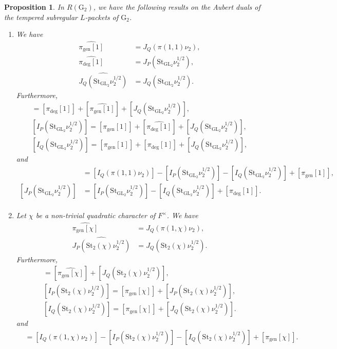 \documentclass[12pt]{amsart}
\theoremstyle{definition}
\theoremstyle{plain}
\newtheorem{proposition}[definition]{Proposition}
\theoremstyle{remark}
\def\GL{\mathrm{GL}}
\numberwithin{equation}{section}
\newcommand{\gen}{\mathrm{gen}}
\newcommand{\rG}{\mathrm{G}}
\newcommand{\St}{\mathrm{St}}
\begin{document}
\begin{proposition}\label{prop:subregular-abelian-Aubert-dual-computation}
      In $R(\rG_2)$, we have the following results on the Aubert duals of the tempered subregular $L$-packets of ${\rG_2}$.

      \begin{enumerate}
      \item 
      We have 
      \begin{align*}
            \widehat{\pi_{\gen}[1]} &= J_Q(\pi(1, 1) \nu_2), \\
            \widehat{\pi_{\deg}[1]} &= J_P(\St_{\GL_2}\nu_2^{1/2}), \\
            \widehat{J_Q(\St_{\GL_2}\nu_2^{1/2})} &= J_Q(\St_{\GL_2}\nu_2^{1/2}).
      \end{align*}
      Furthermore, 
      \begin{align*}
            [I_P(\mathbf{1}_{\GL_2}\nu_2^{1/2})] = [\pi_{\deg}[1]] + [\widehat{\pi_{\gen}[1]}] + [J_Q(\St_{\GL_2}\nu_2^{1/2})], \\
            [I_P(\St_{\GL_2}\nu_2^{1/2})] 
            =
             [\pi_{\gen}[1]] + [\widehat{\pi_{\deg}[1]}] + [J_Q(\St_{\GL_2}\nu_2^{1/2})], \\
            [I_Q(\St_{\GL_2}\nu_2^{1/2})] = [\pi_{\gen}[1]] + [\pi_{\deg}[1]] + [J_Q(\St_{\GL_2}\nu_2^{1/2})],
      \end{align*}
      and
      \begin{align*}
            [J_Q(\pi(1, 1) \nu_2)] &= [I_Q(\pi(1, 1)\nu_2)] - [I_P(\St_{\GL_2}\nu_2^{1/2})] - [I_Q(\St_{\GL_2}\nu_2^{1/2})] + [\pi_{\mathrm{gen}}[1]], \\
            [J_P(\St_{\GL_2}\nu_2^{1/2})] &= [I_P(\St_{\GL_2}\nu_2^{1/2})] - [I_Q(\St_{\GL_2}\nu_2^{1/2})] + [\pi_{\deg}[1]]. \\
      \end{align*}

      \item
      Let $\chi$ be a non-trivial quadratic character of $F^{\times}$.
      We have
      \begin{align*}
            \widehat{\pi_{\gen}[\chi]} &= J_Q(\pi(1, \chi) \nu_2), \\
            \widehat{J_P(\St_2(\chi)\nu_2^{1/2})} &= J_Q(\St_2(\chi)\nu_2^{1/2}).
      \end{align*}
      Furthermore, 
      \begin{align*}
            [I_P(\chi \circ \det \nu_2^{1/2})] = [\widehat{\pi_{\gen}[\chi]}] + [J_Q(\St_2(\chi)\nu_2^{1/2})], \\
            [I_P(\St_2(\chi)\nu_2^{1/2})] = [\pi_{\gen}[\chi]] + [J_P(\St_2(\chi)\nu_2^{1/2})], \\
            [I_Q(\St_2(\chi)\nu_2^{1/2})] = [\pi_{\gen}[\chi]] + [J_Q(\St_2(\chi)\nu_2^{1/2})].
      \end{align*}
      and
      \begin{align*}
            [J_Q(\pi(1, \chi) \nu_2)] &= [I_Q(\pi(1, \chi)\nu_2)] - [I_P(\St_2(\chi)\nu_2^{1/2})] - [I_Q(\St_{2}(\chi)\nu_2^{1/2})] + [\pi_{\mathrm{gen}}[\chi]].
      \end{align*}


\end{enumerate}
\end{proposition}
\end{document}
